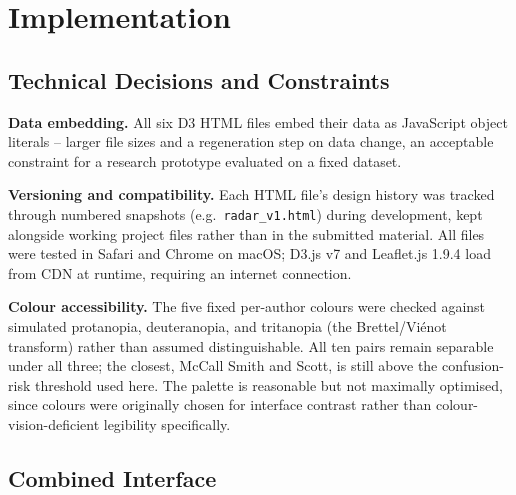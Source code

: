 \documentclass[logo,msc]{infthesis}
\begin{document}
 
\chapter{Implementation}
\label{chap:impl}
 
\section{Technical Decisions and Constraints}
\label{sec:technical-decisions}

\textbf{Data embedding.} All six D3 HTML files embed their data as JavaScript object literals -- larger file sizes and a regeneration step on data change, an acceptable constraint for a research prototype evaluated on a fixed dataset.
 
\textbf{Versioning and compatibility.} Each HTML file's design history was tracked through numbered snapshots (e.g.\ \texttt{radar\_v1.html}) during development, kept alongside working project files rather than in the submitted material. All files were tested in Safari and Chrome on macOS; D3.js v7 and Leaflet.js 1.9.4 load from CDN at runtime, requiring an internet connection.

\textbf{Colour accessibility.} The five fixed per-author colours were checked against simulated protanopia, deuteranopia, and tritanopia (the Brettel/Vi{\'e}not transform) rather than assumed distinguishable. All ten pairs remain separable under all three; the closest, McCall Smith and Scott, is still above the confusion-risk threshold used here. The palette is reasonable but not maximally optimised, since colours were originally chosen for interface contrast rather than colour-vision-deficient legibility specifically.
 
\section{Combined Interface}
\label{sec:combined-interface}
\end{document}

